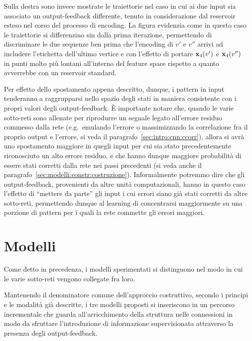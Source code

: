 Sulla destra sono invece mostrate le traiettorie nel caso in cui ai due input sia associato un output-feedback differente, tenuto in considerazione dal reservoir esteso nel corso del processo di encoding. La figura evidenzia come in questo caso le traiettorie si differenzino sin dalla prima iterazione, permettendo di discriminare le due sequenze ben prima che l'encoding di $v'$ e $v''$ arrivi ad includere l'etichetta dell'ultimo vertice e con l'effetto di portare $\mathbf{x}_4(v')$ e $\mathbf{x}_4(v'')$ in punti molto più lontani all'interno del feature space rispetto a quanto avverrebbe con un reservoir standard.

Per effetto dello spostamento appena descritto, dunque, i pattern in input tenderanno a raggrupparsi nello spazio degli stati in maniera consistente con i propri valori degli output-feedback. \`E importante notare che, quando le varie sotto-reti sono allenate per riprodurre un segnale legato all'errore residuo commesso dalla rete (e.g.\ emulando l'errore o massimizzando la correlazione fra il proprio output e l'errore, si veda il paragrafo~\vref{sec:intro:cnn:ccorr}), allora si avrà uno spostamento maggiore in quegli input per cui sia stato precedentemente riconosciuto un alto errore residuo, e che hanno dunque maggiore probabilità di essere stati corretti dalla rete nei passi precedenti (si veda anche il paragrafo~\ref{sec:modelli:constr:costruzione}). Informalmente potremmo dire che gli output-feedback, provenienti da altre unità computazionali, hanno in questo caso l'effetto di ``mettere da parte'' gli input i cui errori siano già stati corretti da altre sotto-reti, permettendo dunque al learning di concentrarsi maggiormente su una porzione di pattern per i quali la rete commette gli errori maggiori.



\section{Modelli}\label{sec:modelli:modelli}
Come detto in precedenza, i modelli sperimentati si distinguono nel modo in cui le varie sotto-reti vengono collegate fra loro. 

Mantenendo il denominatore comune dell'approccio costruttivo, secondo i principi e le modalità già descritte, i tre modelli proposti si inseriscono in un percorso incrementale che guarda all'arricchimento della struttura nelle connessioni in modo da sfruttare l'introduzione di informazione supervisionata attraverso la presenza degli output-feedback. 


